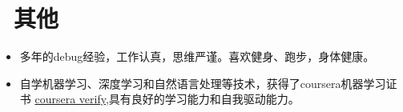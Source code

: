 \documentclass{resume}
\begin{document}



\section{\faInfo\ 其他}\normalsize
\begin{itemize}
\item {多年的debug经验，工作认真，思维严谨。喜欢健身、跑步，身体健康。}
\item {自学机器学习、深度学习和自然语言处理等技术，获得了coursera机器学习证书} \href{https://www.coursera.org/account/accomplishments/verify/NFCZEBTZ5T4L}{coursera verify}{,具有良好的学习能力和自我驱动能力。}
\end{itemize}

%
%
\end{document}
